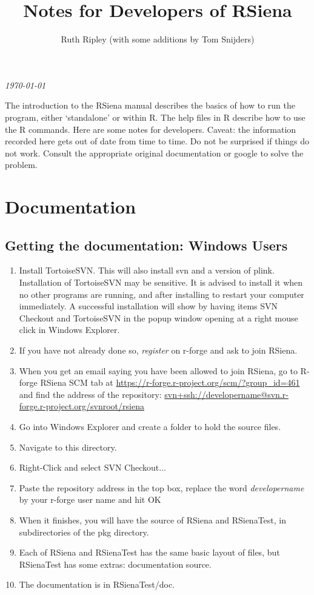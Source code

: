 \documentclass[12pt, a4paper]{article}
\renewcommand{\=}{\,=\,}
\newcommand{\+}{\,+\,}
\begin{document}
\title{\vspace*{-0.5cm} Notes for Developers of RSiena}
\author{Ruth Ripley (with some additions by Tom Snijders)}
\date{}
\maketitle

\centerline{\emph{\today}}
\bigskip

The introduction to the RSiena manual describes the basics of how to run the
program, either `standalone' or within R. The help files in R describe how to
use the R commands. Here are some notes for developers. Caveat: the information
recorded here gets out of date from time to time. Do not be surprised if things
do not work. Consult the appropriate original documentation or google to solve
the problem.

\section{Documentation}
\subsection{Getting the documentation: Windows Users}
\begin{enumerate}
\item Install TortoiseSVN. This will also install \textsf{svn}
    and a version of \textsf{plink}.\\
    Installation of TortoiseSVN may be sensitive. It is advised to
    install it when no other programs are running, and after installing
    to restart your computer immediately.
    A successful installation will show by having items
    SVN Checkout and TortoiseSVN
    in the popup window opening at a right mouse click in Windows Explorer.
\item If you have not already done so, \emph{register} on r-forge and ask to
  join RSiena.
\item When you get an email saying you have been allowed to join RSiena,
  go to R-forge RSiena SCM tab at
  \url{https://r-forge.r-project.org/scm/?group_id=461} and find the address of
  the repository:
\url{svn+ssh://developername@svn.r-forge.r-project.org/svnroot/rsiena}
\item Go into Windows Explorer and create a folder to hold the source files.
\item Navigate to this directory.
\item Right-Click and select SVN Checkout...
\item Paste the repository address in the top box, replace the word
  \emph{developername} by your r-forge user name and hit OK
\item When it finishes, you will have the source of RSiena and RSienaTest, in
  subdirectories of the \textsf{pkg} directory.
\item Each of RSiena and RSienaTest has the same basic layout of files, but
  RSienaTest has some extras: documentation source.
\item The documentation is in RSienaTest/doc.
\end{enumerate}
\end{document}
